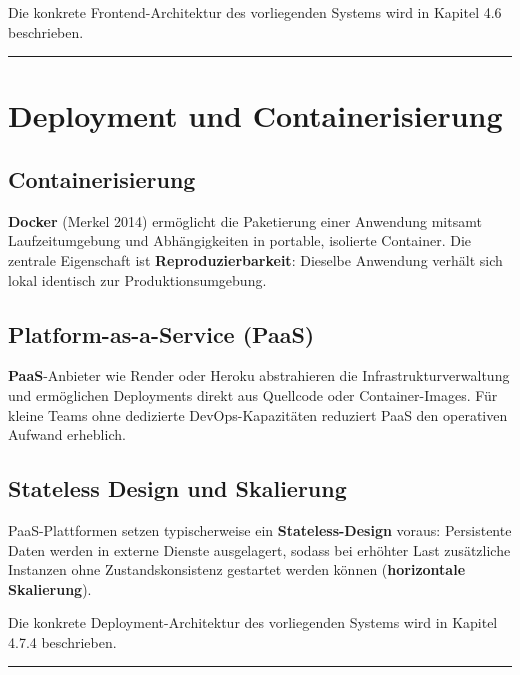 Die konkrete Frontend-Architektur des vorliegenden Systems wird in
Kapitel 4.6 beschrieben.

\begin{center}\rule{0.5\linewidth}{0.5pt}\end{center}

\section{Deployment und
Containerisierung}\label{deployment-und-containerisierung}

\subsection{Containerisierung}\label{containerisierung}

\textbf{Docker} (Merkel 2014) ermöglicht die Paketierung einer Anwendung
mitsamt Laufzeitumgebung und Abhängigkeiten in portable, isolierte
Container. Die zentrale Eigenschaft ist \textbf{Reproduzierbarkeit}:
Dieselbe Anwendung verhält sich lokal identisch zur Produktionsumgebung.

\subsection{Platform-as-a-Service
(PaaS)}\label{platform-as-a-service-paas}

\textbf{PaaS}-Anbieter wie Render oder Heroku abstrahieren die
Infrastrukturverwaltung und ermöglichen Deployments direkt aus Quellcode
oder Container-Images. Für kleine Teams ohne dedizierte
DevOps-Kapazitäten reduziert PaaS den operativen Aufwand erheblich.

\subsection{Stateless Design und
Skalierung}\label{stateless-design-und-skalierung}

PaaS-Plattformen setzen typischerweise ein \textbf{Stateless-Design}
voraus: Persistente Daten werden in externe Dienste ausgelagert, sodass
bei erhöhter Last zusätzliche Instanzen ohne Zustandskonsistenz
gestartet werden können (\textbf{horizontale Skalierung}).

Die konkrete Deployment-Architektur des vorliegenden Systems wird in
Kapitel 4.7.4 beschrieben.

\begin{center}\rule{0.5\linewidth}{0.5pt}\end{center}

